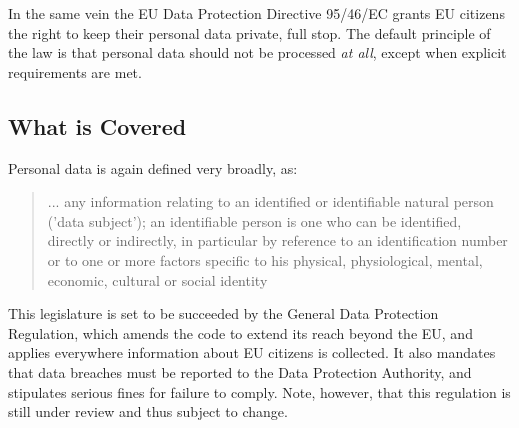 \documentclass[11pt, a4paper]{article}
\begin{document}
In the same vein the EU Data Protection Directive 95/46/EC grants EU citizens the right to keep their personal data private, full stop.
\cite{directive199595}
The default principle of the law is that personal data should not be processed \textit{at all}, except when explicit requirements are met.




\subsection{What is Covered}
Personal data is again defined very broadly, as:
\begin{quote}
... any information relating to an identified or identifiable natural person ('data subject'); an identifiable person is one who can be identified, directly or indirectly, in particular by reference to an identification number or to one or more factors specific to his physical, physiological, mental, economic, cultural or social identity
\end{quote}



This legislature is set to be succeeded by the General Data Protection Regulation, which amends the code to extend its reach beyond the EU, and applies everywhere information about EU citizens is collected.
It also mandates that data breaches must be reported to the Data Protection Authority, and stipulates serious fines for failure to comply.
Note, however, that this regulation is still under review and thus subject to change.
\end{document}
